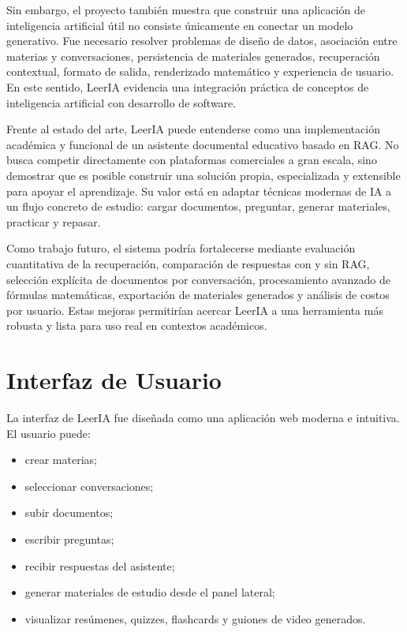 \documentclass[12pt, letterpaper]{article}
\begin{document}
	Sin embargo, el proyecto también muestra que construir una aplicación de inteligencia artificial útil no consiste únicamente en conectar un modelo generativo. Fue necesario resolver problemas de diseño de datos, asociación entre materias y conversaciones, persistencia de materiales generados, recuperación contextual, formato de salida, renderizado matemático y experiencia de usuario. En este sentido, LeerIA evidencia una integración práctica de conceptos de inteligencia artificial con desarrollo de software.
	
	Frente al estado del arte, LeerIA puede entenderse como una implementación académica y funcional de un asistente documental educativo basado en RAG. No busca competir directamente con plataformas comerciales a gran escala, sino demostrar que es posible construir una solución propia, especializada y extensible para apoyar el aprendizaje. Su valor está en adaptar técnicas modernas de IA a un flujo concreto de estudio: cargar documentos, preguntar, generar materiales, practicar y repasar.
	
	Como trabajo futuro, el sistema podría fortalecerse mediante evaluación cuantitativa de la recuperación, comparación de respuestas con y sin RAG, selección explícita de documentos por conversación, procesamiento avanzado de fórmulas matemáticas, exportación de materiales generados y análisis de costos por usuario. Estas mejoras permitirían acercar LeerIA a una herramienta más robusta y lista para uso real en contextos académicos.
	

	\section{Interfaz de Usuario}

	
	La interfaz de LeerIA fue diseñada como una aplicación web moderna e intuitiva. El usuario puede:
	
	\begin{itemize}
		\item crear materias;
		\item seleccionar conversaciones;
		\item subir documentos;
		\item escribir preguntas;
		\item recibir respuestas del asistente;
		\item generar materiales de estudio desde el panel lateral;
		\item visualizar resúmenes, quizzes, flashcards y guiones de video generados.
	\end{itemize}
	
\end{document}
